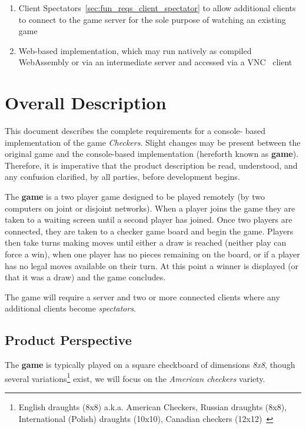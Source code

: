 \documentclass[letterpaper]{article}
\begin{document}
\begin{enumerate}
    \item Client Spectators~\cref{sec:fun_reqs_client_spectator}
          to allow additional clients to connect to the game
          server for the sole purpose of watching an existing
          game
    \item Web-based implementation, which may run natively as
          compiled WebAssembly\cite{webassembly} or via an
          intermediate server and accessed via a VNC~\cite{vnc}
          client
\end{enumerate}


\section{Overall Description}
\label{sec:description}

This document describes the complete requirements for a console-
based implementation of the game \emph{Checkers}. Slight changes
may be present between the original game and the console-based
implementation (hereforth known as \textbf{game}). Therefore, it
is imperative that the product description be read, understood,
and any confusion clarified, by all parties, before development
begins.

The \textbf{game} is a two player game designed to be played
remotely (by two computers on joint or disjoint networks). When
a player joins the game they are taken to a waiting screen until
a second player has joined. Once two players are connected, they
are taken to a checker game board and begin the game. Players
then take turns making moves until either a draw is reached
(neither play can force a win), when one player has no pieces
remaining on the board, or if a player has no legal moves 
available on their turn. At this point a winner is displayed 
(or that it was a draw) and the game concludes.

The game will require a server and two or more connected clients
where any additional clients become \emph{spectators}.

\subsection{Product Perspective}
\label{sec:description_product}

The \textbf{game} is typically played on a square checkboard of
dimensions \emph{8x8}, though several variations\footnote{
    English draughts (8x8) a.k.a. American Checkers,
    Russian draughts (8x8),
    International (Polish) draughts (10x10),
    Canadian checkers (12x12)~\cite{draughts}
} exist, we will focus on the \emph{American checkers} variety.
\end{document}
